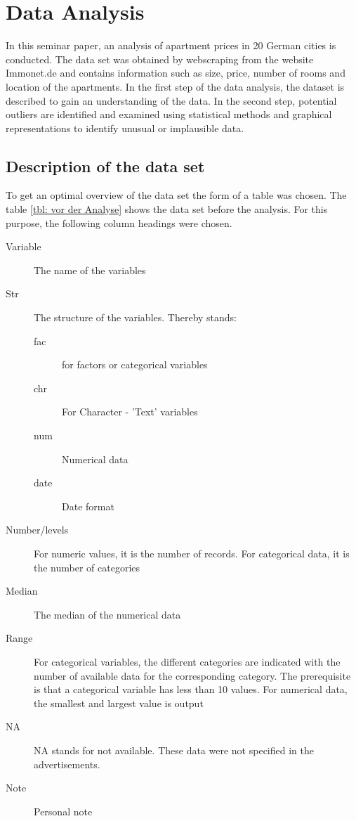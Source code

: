 	\chapter{Data Analysis}\label{sec:Datenanalyse}
In this seminar paper, an analysis of apartment prices in 20 German cities is conducted. The data set was obtained by webscraping from the website Immonet.de and contains information such as size, price, number of rooms and location of the apartments. In the first step of the data analysis, the dataset is described to gain an understanding of the data. In the second step, potential outliers are identified and examined using statistical methods and graphical representations to identify unusual or implausible data. 


\section{Description of the data set}

To get an optimal overview of the data set the form of a table was chosen. The table \ref{tbl: vor der Analyse} shows the data set before the analysis. For this purpose, the following column headings were chosen. 
\begin{description}
	\item[Variable] The name of the  variables 		
	\item[Str] The structure of the variables. Thereby stands:
	\begin{description}
		\item[fac] for factors or categorical variables
		\item[chr] For Character - 'Text' variables
		\item[num] Numerical data
		\item[date] Date format
		
	\end{description}
	\item[Number/levels] For numeric values, it is the number of records. For categorical data, it is the number of categories
	\item[Median] The median of the numerical data
	\item[Range] For categorical variables, the different categories are indicated with the number of available data for the corresponding category. The prerequisite is that a categorical variable has less than 10 values. For numerical data, the smallest and largest value is output
	\item[NA] NA stands for not available. These data were not specified in the advertisements.
	\item[Note] Personal note
	
\end{description}

